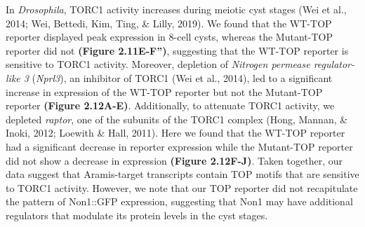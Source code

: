 \documentclass[12pt,oneside]{reedthesis}
\begin{document}
In \emph{Drosophila}, TORC1 activity increases during meiotic cyst stages (Wei et al., 2014; Wei, Bettedi, Kim, Ting, \& Lilly, 2019). We found that the WT-TOP reporter displayed peak expression in 8-cell cysts, whereas the Mutant-TOP reporter did not \textbf{(Figure 2.11E-F'')}, suggesting that the WT-TOP reporter is sensitive to TORC1 activity. Moreover, depletion of \emph{Nitrogen permease regulator-like 3} (\emph{Nprl3}), an inhibitor of TORC1 (Wei et al., 2014), led to a significant increase in expression of the WT-TOP reporter but not the Mutant-TOP reporter \textbf{(Figure 2.12A-E)}. Additionally, to attenuate TORC1 activity, we depleted \emph{raptor}, one of the subunits of the TORC1 complex (Hong, Mannan, \& Inoki, 2012; Loewith \& Hall, 2011). Here we found that the WT-TOP reporter had a significant decrease in reporter expression while the Mutant-TOP reporter did not show a decrease in expression \textbf{(Figure 2.12F-J)}. Taken together, our data suggest that Aramis-target transcripts contain TOP motifs that are sensitive to TORC1 activity. However, we note that our TOP reporter did not recapitulate the pattern of Non1::GFP expression, suggesting that Non1 may have additional regulators that modulate its protein levels in the cyst stages.
\end{document}
